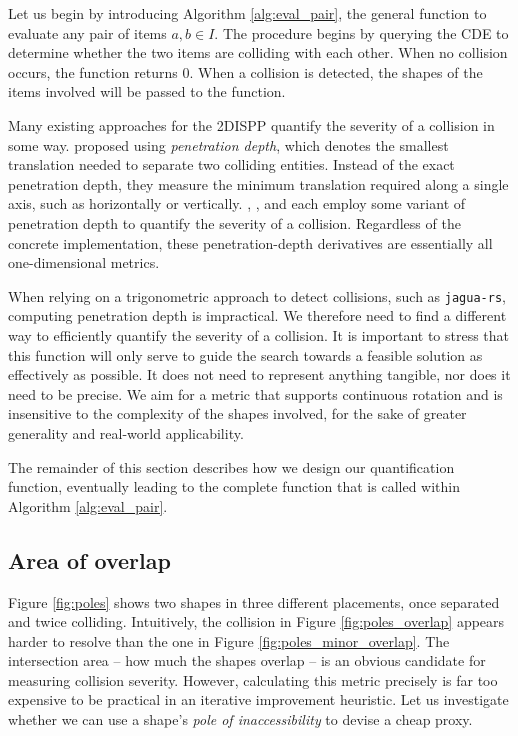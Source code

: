 \documentclass[preprint, 11pt, authoryear]{elsarticle}
\begin{document}


Let us begin by introducing Algorithm \ref{alg:eval_pair}, the general function to evaluate any pair of items $a,b \in I$. 
The procedure begins by querying the CDE to determine whether the two items are colliding with each other.
When no collision occurs, the function returns 0.
When a collision is detected, the shapes of the items involved will be passed to the  function.

Many existing approaches for the 2DISPP quantify the severity of a collision in some way.
\citet{imamichi2009iterated} proposed using \emph{penetration depth}, which denotes the smallest translation needed to separate two colliding entities.
Instead of the exact penetration depth, they measure the minimum translation required along a single axis, such as horizontally or vertically. 
\citet{leung2012extended}, \citet{elkeran2013new}, \citet{wang2017flexible} and \citet{sato2019raster} each employ some variant of penetration depth to quantify the severity of a collision.
Regardless of the concrete implementation, these penetration-depth derivatives are essentially all one-dimensional metrics.

When relying on a trigonometric approach to detect collisions, such as \texttt{jagua-rs}, computing penetration depth is impractical.
We therefore need to find a different way to efficiently quantify the severity of a collision. 
It is important to stress that this function will only serve to guide the search towards a feasible solution as effectively as possible.
It does not need to represent anything tangible, nor does it need to be precise.
We aim for a metric that supports continuous rotation and is insensitive to the complexity of the shapes involved, for the sake of greater generality and real-world applicability.

The remainder of this section describes how we design our quantification function, eventually leading to the complete  function that is called within Algorithm \ref{alg:eval_pair}.

\subsection{Area of overlap}
Figure \ref{fig:poles} shows two shapes in three different placements, once separated and twice colliding.
Intuitively, the collision in Figure \ref{fig:poles_overlap} appears harder to resolve than the one in Figure \ref{fig:poles_minor_overlap}.
The intersection area -- how much the shapes overlap -- is an obvious candidate for measuring collision severity.
However, calculating this metric precisely is far too expensive to be practical in an iterative improvement heuristic.
Let us investigate whether we can use a shape's \emph{pole of inaccessibility} to devise a cheap proxy.
\end{document}
